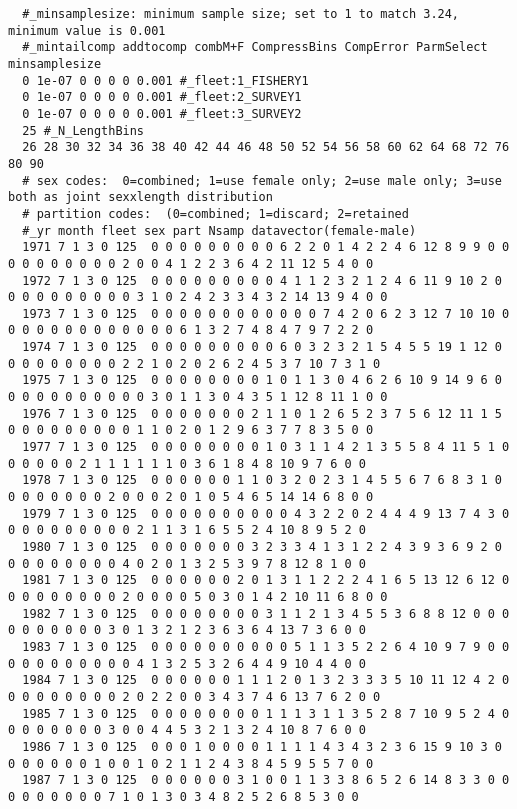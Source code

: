 \begin{landscape}
{\begin{verbatim}
  #_minsamplesize: minimum sample size; set to 1 to match 3.24, minimum value is 0.001
  #_mintailcomp addtocomp combM+F CompressBins CompError ParmSelect minsamplesize
  0 1e-07 0 0 0 0 0.001 #_fleet:1_FISHERY1
  0 1e-07 0 0 0 0 0.001 #_fleet:2_SURVEY1
  0 1e-07 0 0 0 0 0.001 #_fleet:3_SURVEY2
  25 #_N_LengthBins
  26 28 30 32 34 36 38 40 42 44 46 48 50 52 54 56 58 60 62 64 68 72 76 80 90
  # sex codes:  0=combined; 1=use female only; 2=use male only; 3=use both as joint sexxlength distribution
  # partition codes:  (0=combined; 1=discard; 2=retained
  #_yr month fleet sex part Nsamp datavector(female-male)
  1971 7 1 3 0 125  0 0 0 0 0 0 0 0 0 6 2 2 0 1 4 2 2 4 6 12 8 9 9 0 0 0 0 0 0 0 0 0 0 2 0 0 4 1 2 2 3 6 4 2 11 12 5 4 0 0
  1972 7 1 3 0 125  0 0 0 0 0 0 0 0 0 4 1 1 2 3 2 1 2 4 6 11 9 10 2 0 0 0 0 0 0 0 0 0 0 3 1 0 2 4 2 3 3 4 3 2 14 13 9 4 0 0
  1973 7 1 3 0 125  0 0 0 0 0 0 0 0 0 0 0 0 7 4 2 0 6 2 3 12 7 10 10 0 0 0 0 0 0 0 0 0 0 0 0 0 6 1 3 2 7 4 8 4 7 9 7 2 2 0
  1974 7 1 3 0 125  0 0 0 0 0 0 0 0 0 6 0 3 2 3 2 1 5 4 5 5 19 1 12 0 0 0 0 0 0 0 0 0 2 2 1 0 2 0 2 6 2 4 5 3 7 10 7 3 1 0
  1975 7 1 3 0 125  0 0 0 0 0 0 0 0 1 0 1 1 3 0 4 6 2 6 10 9 14 9 6 0 0 0 0 0 0 0 0 0 0 0 3 0 1 1 3 0 4 3 5 1 12 8 11 1 0 0
  1976 7 1 3 0 125  0 0 0 0 0 0 0 2 1 1 0 1 2 6 5 2 3 7 5 6 12 11 1 5 0 0 0 0 0 0 0 0 0 1 1 0 2 0 1 2 9 6 3 7 7 8 3 5 0 0
  1977 7 1 3 0 125  0 0 0 0 0 0 0 0 1 0 3 1 1 4 2 1 3 5 5 8 4 11 5 1 0 0 0 0 0 0 2 1 1 1 1 1 1 0 3 6 1 8 4 8 10 9 7 6 0 0
  1978 7 1 3 0 125  0 0 0 0 0 0 1 1 0 3 2 0 2 3 1 4 5 5 6 7 6 8 3 1 0 0 0 0 0 0 0 0 2 0 0 0 2 0 1 0 5 4 6 5 14 14 6 8 0 0
  1979 7 1 3 0 125  0 0 0 0 0 0 0 0 0 0 4 3 2 2 0 2 4 4 4 9 13 7 4 3 0 0 0 0 0 0 0 0 0 0 2 1 1 3 1 6 5 5 2 4 10 8 9 5 2 0
  1980 7 1 3 0 125  0 0 0 0 0 0 0 3 2 3 3 4 1 3 1 2 2 4 3 9 3 6 9 2 0 0 0 0 0 0 0 0 0 4 0 2 0 1 3 2 5 3 9 7 8 12 8 1 0 0
  1981 7 1 3 0 125  0 0 0 0 0 0 2 0 1 3 1 1 2 2 2 4 1 6 5 13 12 6 12 0 0 0 0 0 0 0 0 0 2 0 0 0 0 5 0 3 0 1 4 2 10 11 6 8 0 0
  1982 7 1 3 0 125  0 0 0 0 0 0 0 0 3 1 1 2 1 3 4 5 5 3 6 8 8 12 0 0 0 0 0 0 0 0 0 0 3 0 1 3 2 1 2 3 6 3 6 4 13 7 3 6 0 0
  1983 7 1 3 0 125  0 0 0 0 0 0 0 0 0 0 5 1 1 3 5 2 2 6 4 10 9 7 9 0 0 0 0 0 0 0 0 0 0 0 4 1 3 2 5 3 2 6 4 4 9 10 4 4 0 0
  1984 7 1 3 0 125  0 0 0 0 0 0 1 1 1 2 0 1 3 2 3 3 3 5 10 11 12 4 2 0 0 0 0 0 0 0 0 0 2 0 2 2 0 0 3 4 3 7 4 6 13 7 6 2 0 0
  1985 7 1 3 0 125  0 0 0 0 0 0 0 0 1 1 1 3 1 1 3 5 2 8 7 10 9 5 2 4 0 0 0 0 0 0 0 0 3 0 0 4 4 5 3 2 1 3 2 4 10 8 7 6 0 0
  1986 7 1 3 0 125  0 0 0 1 0 0 0 0 1 1 1 1 4 3 4 3 2 3 6 15 9 10 3 0 0 0 0 0 0 0 1 0 0 1 0 2 1 1 2 4 3 8 4 5 9 5 5 7 0 0
  1987 7 1 3 0 125  0 0 0 0 0 0 3 1 0 0 1 1 3 3 8 6 5 2 6 14 8 3 3 0 0 0 0 0 0 0 0 0 7 1 0 1 3 0 3 4 8 2 5 2 6 8 5 3 0 0

\end{verbatim}}
\end{landscape}
